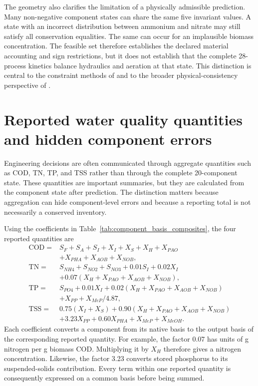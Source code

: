 The geometry also clarifies the limitation of a physically admissible prediction. Many non-negative component states can share the same five invariant values. A state with an incorrect distribution between ammonium and nitrate may still satisfy all conservation equalities. The same can occur for an implausible biomass concentration. The feasible set therefore establishes the declared material accounting and sign restrictions, but it does not establish that the complete 28-process kinetics balance hydraulics and aeration at that state. This distinction is central to the constraint methods of \citet{KircherVotsmeier2025} and to the broader physical-consistency perspective of \citet{Valente2025}.

\section{Reported water quality quantities and hidden component errors}

Engineering decisions are often communicated through aggregate quantities such as COD, TN, TP, and TSS rather than through the complete 20-component state. These quantities are important summaries, but they are calculated from the component state after prediction. The distinction matters because aggregation can hide component-level errors and because a reporting total is not necessarily a conserved inventory.

Using the coefficients in Table~\ref{tab:component_basis_composites}, the four reported quantities are
\[
\begin{aligned}
\mathrm{COD}={}&S_F+S_A+S_I+X_I+X_S+X_H+X_{PAO}\\
&+X_{PHA}+X_{AOB}+X_{NOB},\\[2pt]
\mathrm{TN}={}&S_{NH4}+S_{NO2}+S_{NO3}+0.01S_I+0.02X_I\\
&+0.07(X_H+X_{PAO}+X_{AOB}+X_{NOB}),\\[2pt]
\mathrm{TP}={}&S_{PO4}+0.01X_I+0.02(X_H+X_{PAO}+X_{AOB}+X_{NOB})\\
&+X_{PP}+X_{MeP}/4.87,\\[2pt]
\mathrm{TSS}={}&0.75(X_I+X_S)+0.90(X_H+X_{PAO}+X_{AOB}+X_{NOB})\\
&+3.23X_{PP}+0.60X_{PHA}+X_{MeP}+X_{MeOH}.
\end{aligned}
\]
Each coefficient converts a component from its native basis to the output basis of the corresponding reported quantity. For example, the factor 0.07 has units of g nitrogen per g biomass COD. Multiplying it by $X_H$ therefore gives a nitrogen concentration. Likewise, the factor 3.23 converts stored phosphorus to its suspended-solids contribution. Every term within one reported quantity is consequently expressed on a common basis before being summed.

